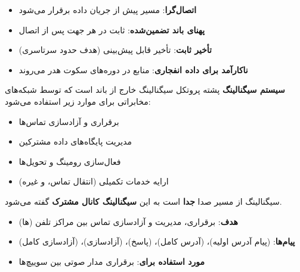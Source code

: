 
\begin{itemize}
\tightlist
\item
  \textbf{اتصال‌گرا}: مسیر پیش از جریان داده برقرار می‌شود
\item
  \textbf{پهنای باند تضمین‌شده}:  ثابت در هر جهت پس از اتصال
\item
  \textbf{تأخیر ثابت}: تأخیر قابل پیش‌بینی (هدف حدود  سرتاسری)
\item
  \textbf{ناکارآمد برای داده انفجاری}: منابع در دوره‌های سکوت هدر می‌روند
\end{itemize}



\CNchained{}

\textbf{سیستم سیگنالینگ } پشته پروتکل سیگنالینگ خارج از باند است که توسط شبکه‌های مخابراتی برای موارد زیر استفاده می‌شود:

\begin{itemize}
\tightlist
\item
  برقراری و آزادسازی تماس‌ها
\item
  مدیریت پایگاه‌های داده مشترکین
\item
  فعال‌سازی رومینگ و تحویل‌ها
\item
  ارایه خدمات تکمیلی (انتقال تماس،  و غیره)
\end{itemize}

سیگنالینگ  از مسیر صدا \textbf{جدا} است  به این \textbf{سیگنالینگ کانال مشترک } گفته می‌شود.






\CNchained{}

\begin{itemize}
\tightlist
\item
  \textbf{هدف}: برقراری، مدیریت و آزادسازی تماس بین مراکز تلفن (ها)
\item
  \textbf{پیام‌ها}:  (پیام آدرس اولیه)،  (آدرس کامل)،  (پاسخ)،  (آزادسازی)،  (آزادسازی کامل)
\item
  \textbf{مورد استفاده برای}: برقراری مدار صوتی بین سوییچ‌ها
\end{itemize}

